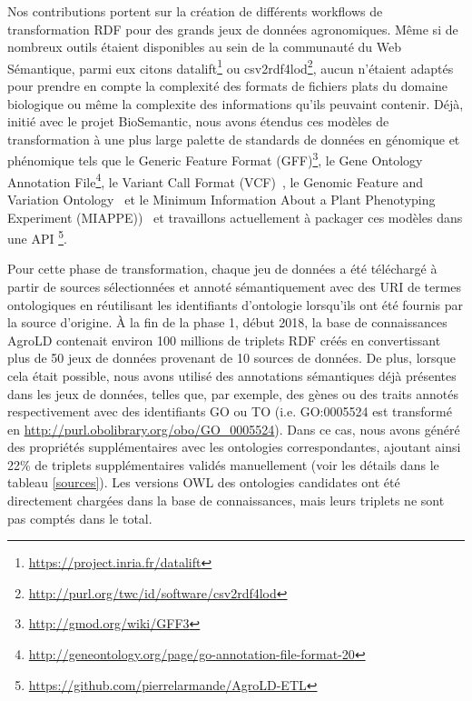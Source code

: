 Nos contributions portent sur la création de différents workflows de transformation RDF pour des grands jeux de données agronomiques. Même si de nombreux outils étaient disponibles au sein de la communauté du Web Sémantique, parmi eux citons datalift\footnote{\url{https://project.inria.fr/datalift}} ou csv2rdf4lod\footnote{\url{http://purl.org/twc/id/software/csv2rdf4lod}}, aucun n'étaient adaptés pour prendre en compte la complexité des formats de fichiers plats du domaine biologique ou même la complexite des informations qu'ils peuvaint contenir. Déjà, initié avec le projet BioSemantic, nous avons étendus ces modèles de transformation à une plus large palette de standards de données en génomique et phénomique tels que le Generic Feature Format (GFF)\footnote{\url{http://gmod.org/wiki/GFF3}}, le Gene Ontology Annotation File\footnote{\url{http://geneontology.org/page/go-annotation-file-format-20}}, le Variant Call Format (VCF)~\cite{danecek2011}, le Genomic Feature and Variation Ontology~\cite{gfvo2015} et le Minimum Information About a Plant Phenotyping Experiment (MIAPPE))~\cite{miappe} et travaillons actuellement à packager ces modèles dans une API \footnote{\url{https://github.com/pierrelarmande/AgroLD-ETL}}. 

Pour cette phase de transformation, chaque jeu de données a été téléchargé à partir de sources sélectionnées et annoté sémantiquement avec des URI de termes ontologiques en réutilisant les identifiants d’ontologie lorsqu’ils ont été fournis par la source d’origine.  À la fin de la phase 1, début 2018, la base de connaissances AgroLD contenait environ 100 millions de triplets RDF créés en convertissant plus de 50 jeux de données provenant de 10 sources de données. De plus, lorsque cela était possible, nous avons utilisé des annotations sémantiques déjà présentes dans les jeux de données, telles que, par exemple, des gènes ou des traits annotés respectivement avec des identifiants GO ou TO (i.e. GO:0005524 est transformé en \url{http://purl.obolibrary.org/obo/GO\_0005524}). Dans ce cas, nous avons généré des propriétés supplémentaires avec les ontologies correspondantes, ajoutant ainsi 22\% de triplets supplémentaires validés manuellement (voir les détails dans le tableau \ref{sources}). Les versions OWL des ontologies candidates ont été directement chargées dans la base de connaissances, mais leurs triplets ne sont pas comptés dans le total.

